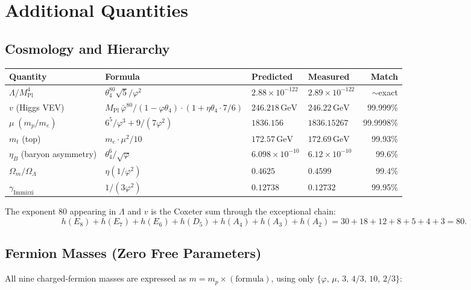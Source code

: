 \documentclass[11pt,a4paper]{article}
\newcommand{\vp}{\varphi}
\newcommand{\vpbar}{\bar{\varphi}}
\newcommand{\Mpl}{M_{\mathrm{Pl}}}
\newcommand{\me}{m_e}
\newcommand{\mpr}{m_p}
\newcommand{\GeV}{\,\mathrm{GeV}}
\begin{document}
\section{Additional Quantities}
\label{sec:additional}

\subsection{Cosmology and Hierarchy}

\begin{center}
\begin{tabular}{@{}llllr@{}}
\toprule
Quantity & Formula & Predicted & Measured & Match \\
\midrule
$\Lambda/\Mpl^4$ & $\theta_4^{80}\sqrt{5}/\vp^2$ & $2.88\times10^{-122}$
  & $2.89\times10^{-122}$ & $\sim$exact \\[4pt]
$v$ (Higgs VEV) & $\Mpl\,\vpbar^{80}/(1-\vp\theta_4)\cdot(1+\eta\theta_4\cdot7/6)$
  & $246.218\GeV$ & $246.22\GeV$ & 99.999\% \\[4pt]
$\mu\;(\mpr/\me)$ & $6^5/\vp^3 + 9/(7\vp^2)$
  & $1836.156$ & $1836.15267$ & 99.9998\% \\[4pt]
$m_t$ (top) & $\me\cdot\mu^2/10$
  & $172.57\GeV$ & $172.69\GeV$ & 99.93\% \\[4pt]
$\eta_B$ (baryon asymmetry) & $\theta_4^6/\!\sqrt{\vp}$
  & $6.098\times10^{-10}$ & $6.12\times10^{-10}$ & 99.6\% \\[4pt]
$\Omega_m/\Omega_\Lambda$ & $\eta(1/\vp^2)$
  & $0.4625$ & $0.4599$ & 99.4\% \\[4pt]
$\gamma_{\mathrm{Immirzi}}$ & $1/(3\vp^2)$
  & $0.12738$ & $0.12732$ & 99.95\% \\
\bottomrule
\end{tabular}
\end{center}

\noindent
The exponent $80$ appearing in $\Lambda$ and $v$ is the Coxeter sum through the
exceptional chain:
\begin{equation}
  h(E_8) + h(E_7) + h(E_6) + h(D_5) + h(A_4) + h(A_3) + h(A_2)
  = 30 + 18 + 12 + 8 + 5 + 4 + 3 = 80.
\end{equation}

\subsection{Fermion Masses (Zero Free Parameters)}

All nine charged-fermion masses are expressed as $m = \mpr\times(\text{formula})$,
using only $\{\vp,\,\mu,\,3,\,4/3,\,10,\,2/3\}$:
\end{document}
